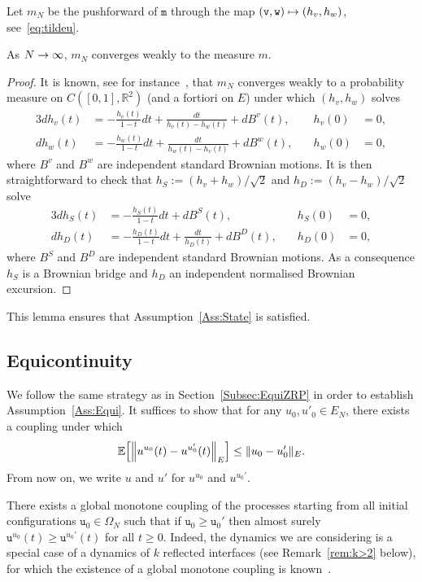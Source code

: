 \documentclass[AHL,Unicode,longabstracts]{cedram}
\theoremstyle{plain}
\newcommand{\ttv}{\mathtt{v}}
\newcommand{\ttw}{\mathtt{w}}
\newcommand{\ttu}{\mathtt{u}}
\newcommand{\ttm}{\mathtt{m}}
\newcommand{\tu}{\mathtt{u}}
\newcommand{\R}{\mathbb{R}}
\newcommand{\E}{\mathbb{E}}
\let\originalleft\left
\let\originalright\right
\renewcommand{\left}{\mathopen{}\mathclose\bgroup\originalleft}
\renewcommand{\right}{\aftergroup\egroup\originalright}
\renewcommand*{\to}{\mathchoice{\longrightarrow}{\rightarrow}{\rightarrow}{\rightarrow}}
\let\oldmapsto\mapsto
\renewcommand*{\mapsto}{\mathchoice{\longmapsto}{\oldmapsto}{\oldmapsto}{\oldmapsto}}
\begin{document}
Let $m_N$ be the pushforward of $\ttm$ through the map $(\ttv,\ttw)\mapsto(h_v,h_w)$, see~\eqref{eq:tildeu}.

\begin{lemm}\label{lemma:CVInvMeas}
As $N\to\infty$, $m_N$ converges weakly to the measure $m$.
\end{lemm}
\begin{proof}
It is known, see for instance~\cite[Theorem~2.7]{Gillet03}, that $m_N$ converges weakly to a probability measure on $C([0,1],\R^2)$ (and a fortiori on $E$) under which $(h_v,h_w)$ solves
\begin{alignat*}{3}
dh_v(t) &= - \frac{h_v(t)}{1-t} dt + \frac{dt}{h_v(t)-h_w(t)} + dB^v(t),\quad &h_v(0) &= 0,\\
dh_w(t) &= - \frac{h_w(t)}{1-t} dt + \frac{dt}{h_w(t)-h_v(t)} + dB^w(t),\quad &h_w(0)&=0,
\end{alignat*}
where $B^v$ and $B^w$ are independent standard Brownian motions. It is then straightforward to check that $h_S:=(h_v+h_w)/\sqrt{2}$ and $h_D:=(h_v-h_w)/\sqrt{2}$ solve
\begin{alignat*}{3}
dh_S(t) &= - \frac{h_S(t)}{1-t} dt + dB^S(t),\quad &h_S(0) &= 0,\\
dh_D(t) &= - \frac{h_D(t)}{1-t} dt + \frac{dt}{h_D(t)} + dB^D(t),\quad &h_D(0)&=0,
\end{alignat*}
where $B^S$ and $B^D$ are independent standard Brownian motions. As a consequence $h_S$ is a Brownian bridge and $h_D$ an independent normalised Brownian excursion.
\end{proof}

This lemma ensures that Assumption~\ref{Ass:State} is satisfied.

\subsection{Equicontinuity}\label{Subsec:EquiPair}

We follow the same strategy as in Section~\ref{Subsec:EquiZRP} in order to establish Assumption~\ref{Ass:Equi}. It suffices to show that for any $u_0,u'_0 \in E_N$, there exists a coupling under which
\begin{equation}\label{Eq:DecayPair}
\E\left[\left\|u^{u_0}(t) - u^{u_0'}(t) \right\|_{E}\right] \le \|u_0-u_0'\|_E.
\end{equation}
From now on, we write $u$ and $u'$ for $u^{u_0}$ and $u^{u_0'}$.

There exists a global monotone coupling of the processes starting from all initial configurations $\tu_0\in\Omega_N$ such that if $\tu_0 \ge \tu_0'$ then almost surely $\ttu^{u_0}(t) \ge \ttu^{u_0'}(t)$ for all $t\ge 0$. Indeed, the dynamics we are considering is a special case of a dynamics of $k$ reflected interfaces (see Remark~\ref{rem:k>2} below), for which the existence of a global monotone coupling is known~\cite{wilson2004mixing}.
\end{document}
